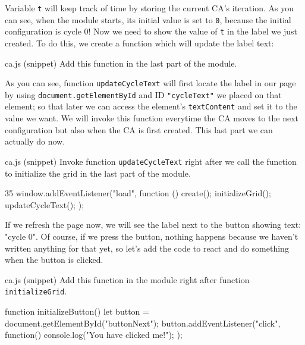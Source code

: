 Variable \texttt{t} will keep track of time by storing the current CA's iteration. As you can see, when the
module starts, its initial value is set to \texttt{0}, because the initial configuration is cycle 0!
Now we need to show the value of \texttt{t} in the label we just created. To do this, we create a function
which will update the label text:

\begin{programcode}{ca.js (snippet)}
Add this function in the last part of the module.
\begin{codeh1}{0}{5}
function updateCycleText() {
  let text = document.getElementById("cycleText");
  text.textContent = "cycle " + t;
}

window.addEventListener("load", function () {
\end{codeh1}
\end{programcode}

As you can see, function \texttt{updateCycleText} will first locate the label in our page by using
\texttt{document.getElementById} and ID \texttt{"cycleText"} we placed on that element; so that later
we can access the element's \texttt{textContent} and set it to the value we want. We will invoke
this function everytime the CA moves to the next configuration but also when the CA is first created.
This last part we can actually do now.

\begin{programcode}{ca.js (snippet)}
Invoke function \texttt{updateCycleText} right after we call the function to initialize the grid in
the last part of the module.
\begin{codeh1}{3}{5}
window.addEventListener("load", function () {
  create();
  initializeGrid();
  updateCycleText();
});
\end{codeh1}
\end{programcode}

If we refresh the page now, we will see the label next to the button showing text: "cycle 0". Of course,
if we press the button, nothing happens because we haven't written anything for that yet, so let's add
the code to react and do something when the button is clicked.

\begin{programcode}{ca.js (snippet)}
Add this function in the module right after function \texttt{initializeGrid}.
\begin{code}
function initializeButton() {
  let button = document.getElementById("buttonNext");
  button.addEventListener("click", function(){
    console.log("You have clicked me!");
  });
}
\end{code}
\end{programcode}

